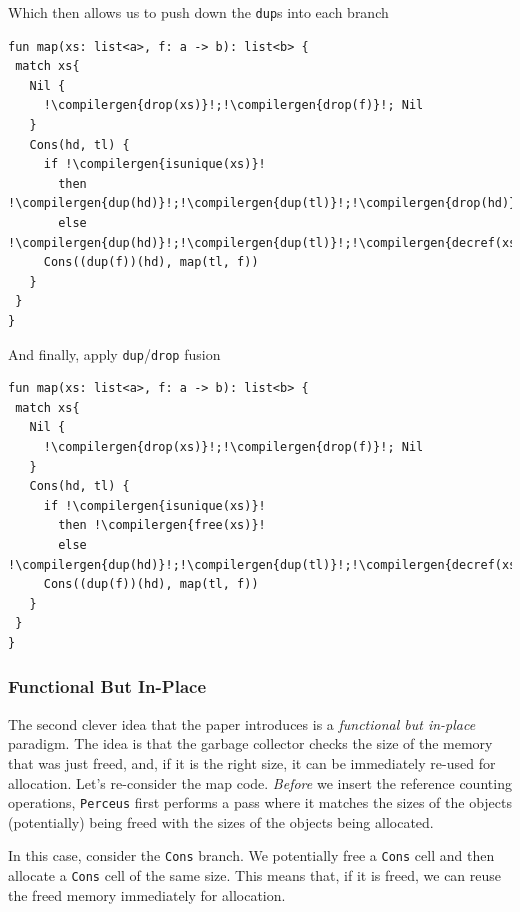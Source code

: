Which then allows us to push down the \texttt{dup}s into each branch

\begin{code}
\label{code:koka-pushdown-dup}
\begin{verbatim}
fun map(xs: list<a>, f: a -> b): list<b> {
 match xs{
   Nil {
     !\compilergen{drop(xs)}!;!\compilergen{drop(f)}!; Nil
   }
   Cons(hd, tl) {
     if !\compilergen{isunique(xs)}! 
       then !\compilergen{dup(hd)}!;!\compilergen{dup(tl)}!;!\compilergen{drop(hd)}!;!\compilergen{drop(tl)}!;!\compilergen{free(xs)}!
       else !\compilergen{dup(hd)}!;!\compilergen{dup(tl)}!;!\compilergen{decref(xs)}!
     Cons((dup(f))(hd), map(tl, f))
   }
 }
}
\end{verbatim}
\end{code}

And finally, apply \texttt{dup}/\texttt{drop} fusion

\begin{code}
\label{code:koka-dup-drop-fusion}
\begin{verbatim}
fun map(xs: list<a>, f: a -> b): list<b> {
 match xs{
   Nil {
     !\compilergen{drop(xs)}!;!\compilergen{drop(f)}!; Nil
   }
   Cons(hd, tl) {
     if !\compilergen{isunique(xs)}! 
       then !\compilergen{free(xs)}!
       else !\compilergen{dup(hd)}!;!\compilergen{dup(tl)}!;!\compilergen{decref(xs)}!
     Cons((dup(f))(hd), map(tl, f))
   }
 }
}
\end{verbatim}
\end{code}

\subsubsection{Functional But In-Place}
The second clever idea that the paper introduces is a \textit{functional but in-place} paradigm. The idea is that the garbage collector checks the size of the memory that was just freed, and, if it is the right size, it can be immediately re-used for allocation. Let's re-consider the map code. \textit{Before} we insert the reference counting operations, \texttt{Perceus} first performs a pass where it matches the sizes of the objects (potentially) being freed with the sizes of the objects being allocated. 

In this case, consider the \texttt{Cons} branch. We potentially free a \texttt{Cons} cell and then allocate a \texttt{Cons} cell of the same size. This means that, if it is freed, we can reuse the freed memory immediately for allocation.

